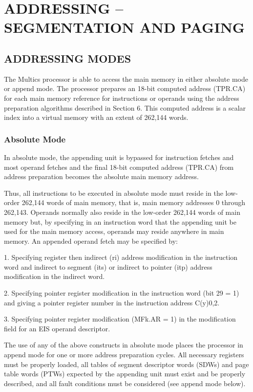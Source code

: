 
\section{ADDRESSING -- SEGMENTATION AND PAGING}
\label {s5}



\subsection{ADDRESSING MODES}



The Multics processor is able to access the main memory in either absolute mode
or append mode. The processor prepares an 18-bit computed address (TPR.CA) for
each main memory reference for instructions or operands using the address
preparation algorithms described in Section 6. This computed address is a
scalar index into a virtual memory with an extent of 262,144 words.  


\subsubsection{Absolute Mode}


In absolute mode, the appending unit is bypassed for instruction fetches and
most operand fetches and the final 18-bit computed address (TPR.CA) from
address preparation becomes the absolute main memory address.


Thus, all instructions to be executed in absolute mode must reside in the
low-order 262,144 words of main memory, that is, main memory addresses 0
through 262,143. Operands normally also reside in the low-order 262,144 words
of main memory but, by specifying in an instruction word that the appending
unit be used for the main memory access, operands may reside anywhere in main
memory. An appended operand fetch may be specified by:


1. Specifying register then indirect (ri) address modification in the
instruction word and indirect to segment (its) or indirect to pointer (itp)
address modification in the indirect word.


2. Specifying pointer register modification in the instruction word (bit 29 =
1) and giving a pointer register number in the instruction address C(y)0,2.


3. Specifying pointer register modification (MFk.AR = 1) in the modification
field for an EIS operand descriptor.


The use of any of the above constructs in absolute mode places the processor in
append mode for one or more address preparation cycles. All necessary registers
must be properly loaded, all tables of segment descriptor words (SDWs) and page
table words (PTWs) expected by the appending unit must exist and be properly
described, and all fault conditions must be considered (see append mode below).


